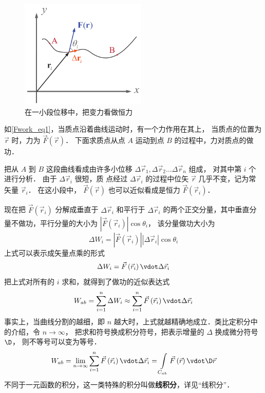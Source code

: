 

\begin{figure}[ht]
\centering
\includegraphics[width=6cm]{./figures/Fwork.pdf}
\caption{在一小段位移中，把变力看做恒力}\label{Fwork_eq1}
\end{figure}

如\autoref{Fwork_eq1}，当质点沿着曲线运动时，有一个力作用在其上， 当质点的位置为 $\vec r$ 时，力为 $\vec F\left( {\vec r} \right)$． 下面求质点从点 $A$ 运动到点 $B$ 的过程中，力对质点的做功．

把从 $A$ 到 $B$ 这段曲线看成由许多小位移 $\Delta {\vec r_1}, \Delta {\vec r_2}\dots\Delta {\vec r_n}$ 组成， 对其中第 $i$ 个进行分析． 由于 $\Delta {\vec r_i}$ 很短，质
点经过 $\Delta {\vec r_i}$ 的过程中位矢 $\vec r$ 几乎不变，记为常矢量 ${\vec r_i}$． 在这小段中，  $\vec F\left( {\vec r} \right)$ 也可以近似看成是恒力 $\vec F(\vec r_i)$． 

现在把 $\vec F\left( {{{\vec r}_i}} \right)$ 分解成垂直于 $\Delta {\vec r_i}$ 和平行于 $\Delta {\vec r_i}$ 的两个正交分量，其中垂直分量不做功，平行分量的大小为 $\left| {\vec F\left( {{{\vec r}_i}} \right)} \right|\cos {\theta _i}$， 该分量做功大小为
\begin{equation}
\Delta {W_i} = \left| {\vec F\left( {{{\vec r}_i}} \right)} \right|\left| {\Delta {{\vec r}_i}} \right|\cos {\theta _i}
\end{equation}
上式可以表示成矢量点乘的形式
\begin{equation}\label{Fwork_eq2}
\Delta {W_i} = \vec F\left( {{{\vec r}_i}} \right) \vdot \Delta {\vec r_i}
\end{equation}
把上式对所有的 $i$ 求和，就得到了做功的近似表达式
\begin{equation}
{W_{ab}} = \sum\limits_{i = 1}^n {\Delta {W_i}}  \approx \sum\limits_{i = 1}^n {\vec F\left( {{{\vec r}_i}} \right) \vdot \Delta {{\vec r}_i}} 
\end{equation} 
事实上，当曲线分割的越细，即 $n$ 越大时，上式就越精确地成立．类比定积分中的介绍，令 $n \to \infty $， 把求和符号换成积分符号，把表示增量的 $\Delta $ 换成微分符号 $\D$， 则不等号可以变为等号．
\begin{equation}
{W_{ab}} = \mathop {\lim }\limits_{n \to \infty } \sum\limits_{i = 1}^n {\vec F\left( {{{\vec r}_i}} \right) \vdot \Delta {{\vec r}_i}}  = \int\limits_{{C_{ab}}} {\vec F\left( {\vec r} \right) \vdot \D \vec r} 
\end{equation} 
不同于一元函数的积分，这一类特殊的积分叫做\textbf{线积分}，详见“线积分”．

